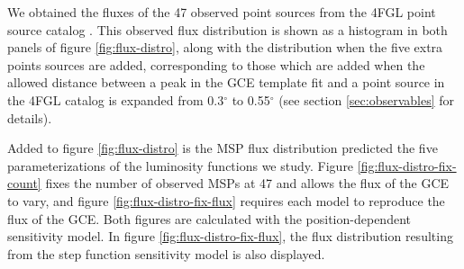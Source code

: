 \documentclass[a4paper,11pt]{article}
\begin{document}
We obtained the fluxes of the 47 observed point sources from the 4FGL point source catalog \cite{Fermi-LAT:2019yla}. This observed flux distribution is shown as a histogram in both panels of figure \ref{fig:flux-distro}, along with the distribution when the five extra points sources are added, corresponding to those which are added when the allowed distance between a peak in the GCE template fit and a point source in the 4FGL catalog is expanded from 0.3$^\circ$ to 0.55$^\circ$ (see section \ref{sec:observables} for details).

Added to figure \ref{fig:flux-distro} is the MSP flux distribution predicted the five parameterizations of the luminosity functions we study. Figure \ref{fig:flux-distro-fix-count} fixes the number of observed MSPs at 47 and allows the flux of the GCE to vary, and figure \ref{fig:flux-distro-fix-flux} requires each model to reproduce the flux of the GCE. Both figures are calculated with the position-dependent sensitivity model. In figure \ref{fig:flux-distro-fix-flux}, the flux distribution resulting from the step function sensitivity model is also displayed.
\end{document}
